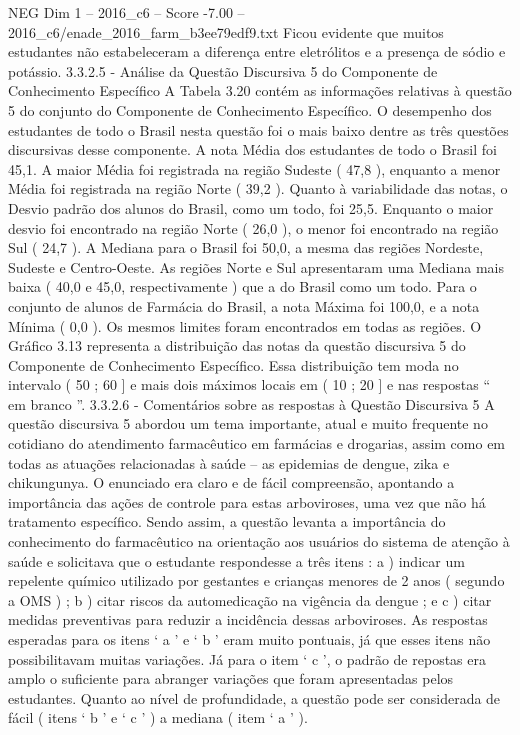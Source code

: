 \begin{textsample}{NEG Dim 1 – 2016\_c6 – Score -7.00 – 2016\_c6/enade\_2016\_farm\_b3ee79edf9.txt}
Ficou evidente que muitos estudantes não estabeleceram a diferença entre eletrólitos e a presença de sódio e potássio. 3.3.2.5 - Análise da Questão Discursiva 5 do Componente de Conhecimento Específico A Tabela 3.20 contém as informações relativas à questão 5 do conjunto do Componente de Conhecimento Específico.
O desempenho dos estudantes de todo o Brasil nesta questão foi o mais baixo dentre as três questões discursivas desse componente.
A nota Média dos estudantes de todo o Brasil foi 45,1.
A maior Média foi registrada na região Sudeste ( 47,8 ), enquanto a menor Média foi registrada na região Norte ( 39,2 ).
Quanto à variabilidade das notas, o Desvio padrão dos alunos do Brasil, como um todo, foi 25,5.
Enquanto o maior desvio foi encontrado na região Norte ( 26,0 ), o menor foi encontrado na região Sul ( 24,7 ).
A Mediana para o Brasil foi 50,0, a mesma das regiões Nordeste, Sudeste e Centro-Oeste.
As regiões Norte e Sul apresentaram uma Mediana mais baixa ( 40,0 e 45,0, respectivamente ) que a do Brasil como um todo.
Para o conjunto de alunos de Farmácia do Brasil, a nota Máxima foi 100,0, e a nota Mínima ( 0,0 ).
Os mesmos limites foram encontrados em todas as regiões.
O Gráfico 3.13 representa a distribuição das notas da questão discursiva 5 do Componente de Conhecimento Específico.
Essa distribuição tem moda no intervalo ( 50 ; 60 ] e mais dois máximos locais em ( 10 ; 20 ] e nas respostas “ em branco ”. 3.3.2.6 - Comentários sobre as respostas à Questão Discursiva 5 A questão discursiva 5 abordou um tema importante, atual e muito frequente no cotidiano do atendimento farmacêutico em farmácias e drogarias, assim como em todas as atuações relacionadas à saúde – as epidemias de dengue, zika e chikungunya.
O enunciado era claro e de fácil compreensão, apontando a importância das ações de controle para estas arboviroses, uma vez que não há tratamento específico.
Sendo assim, a questão levanta a importância do conhecimento do farmacêutico na orientação aos usuários do sistema de atenção à saúde e solicitava que o estudante respondesse a três itens : a ) indicar um repelente químico utilizado por gestantes e crianças menores de 2 anos ( segundo a OMS ) ; b ) citar riscos da automedicação na vigência da dengue ; e c ) citar medidas preventivas para reduzir a incidência dessas arboviroses.
As respostas esperadas para os itens ‘ a ’ e ‘ b ’ eram muito pontuais, já que esses itens não possibilitavam muitas variações.
Já para o item ‘ c ’, o padrão de repostas era amplo o suficiente para abranger variações que foram apresentadas pelos estudantes.
Quanto ao nível de profundidade, a questão pode ser considerada de fácil ( itens ‘ b ’ e ‘ c ’ ) a mediana ( item ‘ a ’ ).

\end{textsample}
